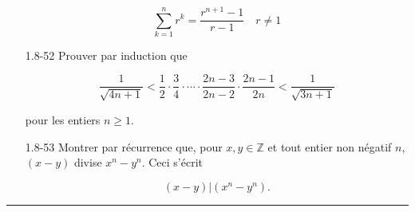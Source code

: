 \documentclass[10pt,twoside,a4paper]{book}
\begin{document}
\begin{enumerate}
  \begin{equation*}
    \boxed{\sum_{k=1}^{n}r^k = \frac{r^{n+1}-1}{r-1} \quad r \neq 1}
  \end{equation*}
  \item[1.8-52] Prouver par induction que
  
  \begin{equation*}
    \frac{1}{\sqrt{4n+1}} < \frac{1}{2} \cdot \frac{3}{4} \cdot \cdots \cdot \frac{2n-3}{2n-2} \cdot \frac{2n-1}{2n} < \frac{1}{\sqrt{3n+1}}
  \end{equation*}

  \noindent
  pour les entiers $n \geq 1$.
  \item[1.8-53] Montrer par récurrence que, pour $x,y \in \mathbb{Z}$ et tout entier non négatif $n$, $(x-y)$ divise $x^n-y^n$. Ceci s'écrit
  
  \begin{equation*}
    (x-y)|(x^n-y^n).
  \end{equation*}
\end{enumerate}

\par\noindent\rule{\textwidth}{0.6pt}
\end{document}
